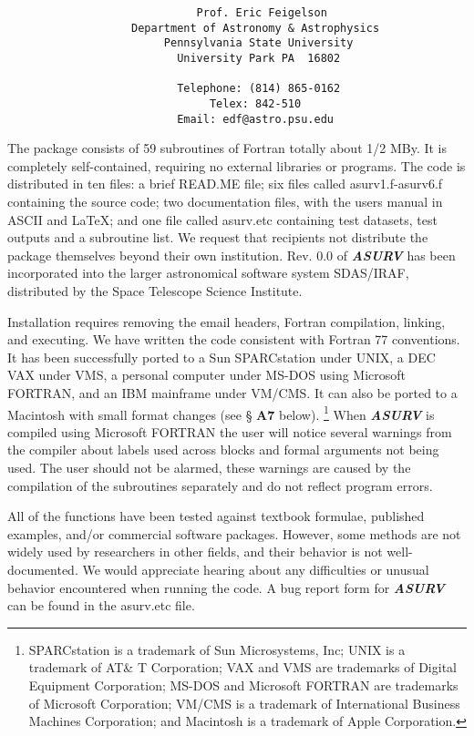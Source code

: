 \begin{center}
\begin{verbatim}
                             Prof. Eric Feigelson 
                   Department of Astronomy & Astrophysics
                        Pennsylvania State University 
                          University Park PA  16802

                          Telephone: (814) 865-0162 
                               Telex: 842-510  
                          Email: edf@astro.psu.edu
\end{verbatim}
\end{center}

The package consists of 59 subroutines of Fortran totally about 1/2 MBy. It
is completely self-contained, requiring no external libraries or programs.  The
code is distributed in ten files: a brief READ.ME file; six files 
called asurv1.f-asurv6.f containing the source code; two documentation files,
with the users manual in ASCII and LaTeX; and one file called asurv.etc
containing test datasets, test outputs and a subroutine list. We request 
that  recipients not 
distribute the package themselves beyond their own institution.  Rev. 0.0
of {\sl\bf ASURV} has been incorporated into the larger astronomical software 
system SDAS/IRAF, distributed by the Space Telescope Science Institute. 
 
     Installation requires removing the email headers, Fortran 
compilation, linking, and executing.  We have written the code
consistent with Fortran 77 conventions.  It has been successfully ported
to a Sun SPARCstation under UNIX, a DEC VAX under VMS, a personal computer
under MS-DOS using Microsoft FORTRAN, and an IBM mainframe under VM/CMS.
It can also be ported to a Macintosh with small format changes (see \S
{\bf A7} below).  
\footnote{SPARCstation is a trademark of Sun Microsystems, Inc; UNIX is a 
trademark of AT\& T Corporation; VAX and VMS are trademarks of Digital 
Equipment Corporation; MS-DOS and Microsoft FORTRAN are trademarks of
Microsoft Corporation; VM/CMS is a trademark of International
Business Machines Corporation; and Macintosh is a trademark of Apple
Corporation.}
When {\sl\bf ASURV} is compiled using Microsoft FORTRAN the
user will notice several warnings from the compiler about labels used across
blocks and formal arguments not being used.  The user should not be alarmed,
these warnings are caused by the compilation of the subroutines separately
and do not reflect program errors.

     All of the functions have been tested against textbook formulae, 
published examples, and/or commercial software  packages.  However, some 
methods are not widely used by researchers in other fields, and their behavior
is not well-documented.  We would appreciate hearing about any difficulties or
unusual behavior encountered when running the code. A bug report form for
{\sl\bf ASURV} can be found in the asurv.etc file. 

